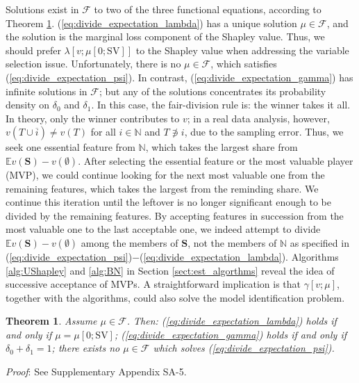 \documentclass[a4paper,12pt]{article}
\newtheorem{theorem}{Theorem}
\begin{document}
Solutions exist in $\mathscr{F}$ to two of the three functional equations, according to Theorem \ref{thm:divide_expectation_lambda}.
(\ref{eq:divide_expectation_lambda}) has a unique solution $\mu \in \mathscr{F}$,
and the solution is the marginal loss component of the Shapley value. Thus,
we should prefer $\lambda[v;\mu[0; \mathrm{SV}]]$ to the Shapley value when addressing the variable selection issue.
Unfortunately, there is no $\mu \in \mathscr{F}$, which satisfies (\ref{eq:divide_expectation_psi}).
In contrast, (\ref{eq:divide_expectation_gamma}) has infinite solutions in $\mathscr{F}$; but any of the solutions concentrates its probability density on  $\delta_0$ and $\delta_1$.
In this case, the fair-division rule is: the winner takes it all.
In theory, only the winner contributes to $v$; in a real data analysis, however, $v(T\cup \overline{i}) \not = v(T)$ for all $i\in \mathbb{N}$ and $T\not \ni i$, due to the sampling error.
Thus, we seek one essential feature from $\mathbb{N}$, which takes the largest share from $\mathbb{E} v(\mathbf{S}) - v(\emptyset)$.
After selecting the essential feature or the most valuable player (MVP), we could continue looking for the next most valuable one from the remaining features, which takes the largest from the reminding share.
We continue this iteration until  the leftover is no longer significant enough to be divided by the remaining features.
By accepting features in succession from the most valuable one to the last acceptable one, we indeed attempt to divide $\mathbb{E} v(\mathbf{S}) - v(\emptyset)$ among the members of $\mathbf{S}$, not the members of $\mathbb{N}$ as specified in (\ref{eq:divide_expectation_psi})$-$(\ref{eq:divide_expectation_lambda}).
Algorithms \ref{alg:UShapley} and \ref{alg:BN} in Section \ref{sect:est_algorthms} reveal the idea of successive acceptance of MVPs.
A straightforward implication is that $\gamma[v;\mu]$, together with the algorithms, could also solve the model identification problem.


\begin{theorem}\label{thm:divide_expectation_lambda} 
Assume $\mu \in \mathscr{F}$. 
Then:
(\ref{eq:divide_expectation_lambda}) holds if and only if $\mu = \mu[0; \mathrm{SV}]$;
(\ref{eq:divide_expectation_gamma}) holds if and only if $\delta_0 +\delta_1 = 1$;
there exists no $\mu \in \mathscr{F}$ which solves (\ref{eq:divide_expectation_psi}).
\end{theorem}

\noindent \textit{Proof}: See Supplementary Appendix SA-5.
\end{document}
